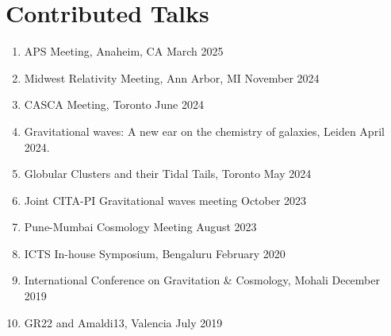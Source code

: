 	\section{Contributed Talks}
	\begin{enumerate}[leftmargin=*]
		\item APS Meeting, Anaheim, CA \hfill March 2025
		\item Midwest Relativity Meeting, Ann Arbor, MI \hfill November 2024
		\item CASCA Meeting, Toronto \hfill June 2024 
		\item {Gravitational waves: A new ear on the chemistry of galaxies}, Leiden \hfill April 2024.
		\item {Globular Clusters and their Tidal Tails}, Toronto \hfill May 2024     
		\item {Joint CITA-PI Gravitational waves meeting} \hfill October 2023 
		\item Pune-Mumbai Cosmology Meeting \hfill August 2023
		\item {ICTS In-house Symposium}, Bengaluru \hfill February 2020 
		\item {International Conference on Gravitation \& Cosmology}, Mohali \hfill December 2019 
		\item {GR22 and Amaldi13}, Valencia \hfill July 2019 			
	\end{enumerate}

		
